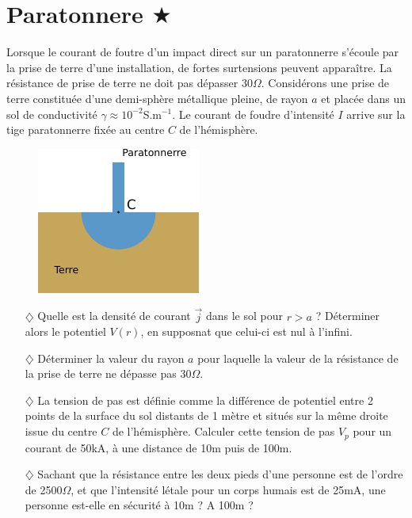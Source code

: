 \documentclass{report}
\begin{document}
\section*{Paratonnere $\bigstar$}

Lorsque le courant de foutre d'un impact direct sur un paratonnerre s'écoule par la prise de terre d'une installation, de fortes surtensions peuvent apparaître. La résistance de prise de terre ne doit pas dépasser 30$\Omega$. Considérons une prise de terre constituée d'une demi-sphère métallique pleine, de rayon $a$ et placée dans un sol de conductivité $\gamma\approx10^{-2}$S.m$^{-1}$. Le courant de foudre d'intensité $I$ arrive sur la tige paratonnerre fixée au centre $C$ de l'hémisphère.

\begin{figure}[h!]
\centering
		\includegraphics[scale=1.5]{EM1.pdf}
\end{figure}

\begin{itemize}
	
	\item[$\diamondsuit$] Quelle est la densité de courant $\vec{j}$ dans le sol pour $r>a$ ? Déterminer alors le potentiel $V(r)$, en supposnat que celui-ci est nul à l'infini. 
	
	\item[$\diamondsuit$] Déterminer la valeur du rayon $a$ pour laquelle la valeur de la résistance de la prise de terre ne dépasse pas 30$\Omega$.
	
	\item[$\diamondsuit$] La tension de pas est définie comme la différence de potentiel entre 2 points de la surface du sol distants de 1 mètre et situés sur la même droite issue du centre $C$ de l'hémisphère. Calculer cette tension de pas $V_p$ pour un courant de 50kA, à une distance de 10m puis de 100m.
	
	\item[$\diamondsuit$] Sachant que la résistance entre les deux pieds d'une personne est de l'ordre de 2500$\Omega$, et que l'intensité létale pour un corps humais est de 25mA, une personne est-elle en sécurité à 10m ? A 100m ? 
	
\end{itemize} 
\end{document}
